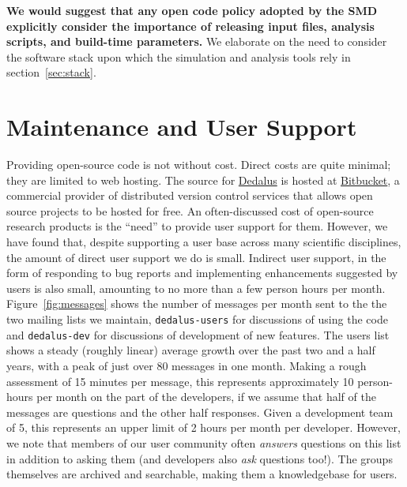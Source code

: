 \documentclass[12pt, titlepage]{aastex62}
\newcommand{\dedalus}{\href{http://dedalus-project.org}{Dedalus}}
\begin{document}
\textbf{We would suggest that any open code policy adopted by the SMD explicitly consider the importance of releasing input files, analysis scripts, and build-time parameters.} We elaborate on the need to consider the software stack upon which the simulation and analysis tools rely in section~\ref{sec:stack}.


\section{Maintenance and User Support}
\label{sec:support}


Providing open-source code is not without cost. Direct costs are quite minimal; they are limited to web hosting. The source for \dedalus{} is hosted at \href{https://bitbucket.org}{Bitbucket}, a commercial provider of distributed version control services that allows open source projects to be hosted for free. An often-discussed cost of open-source research products is the ``need'' to provide user support for them. However, we have found that, despite supporting a user base across many scientific disciplines, the amount of direct user support we do is small. Indirect user support, in the form of responding to bug reports and implementing enhancements suggested by users is also small, amounting to no more than a few person hours per month. Figure~\ref{fig:messages} shows the number of messages per month sent to the the two mailing lists we maintain, \texttt{dedalus-users} for discussions of using the code and \texttt{dedalus-dev} for discussions of development of new features. The users list shows a steady (roughly linear) average growth over the past two and a half years, with a peak of just over 80 messages in one month. Making a rough assessment of 15 minutes per message, this represents approximately 10 person-hours per month on the part of the developers, if we assume that half of the messages are questions and the other half responses. Given a development team of 5, this represents an upper limit of 2 hours per month per developer. However, we note that members of our user community often \emph{answers} questions on this list in addition to asking them (and developers also \emph{ask} questions too!). The groups themselves are archived and searchable, making them a knowledgebase for users. 
\end{document}
